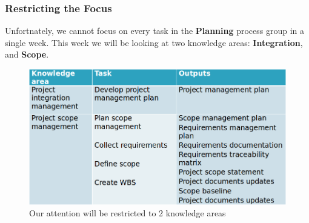 \documentclass{beamer}
\begin{document}
\begin{frame}
\frametitle{Restricting the Focus}
Unfortnately, we cannot focus on every task in the \textbf{Planning} process group in a single week. This week we will be looking at two knowledge areas: \textbf{Integration}, and \textbf{Scope}.

\begin{figure}
\includegraphics[scale=0.4]{planning_proc}
\caption{Our attention will be restricted to 2 knowledge areas}
\end{figure}
\end{frame}
\end{document}

